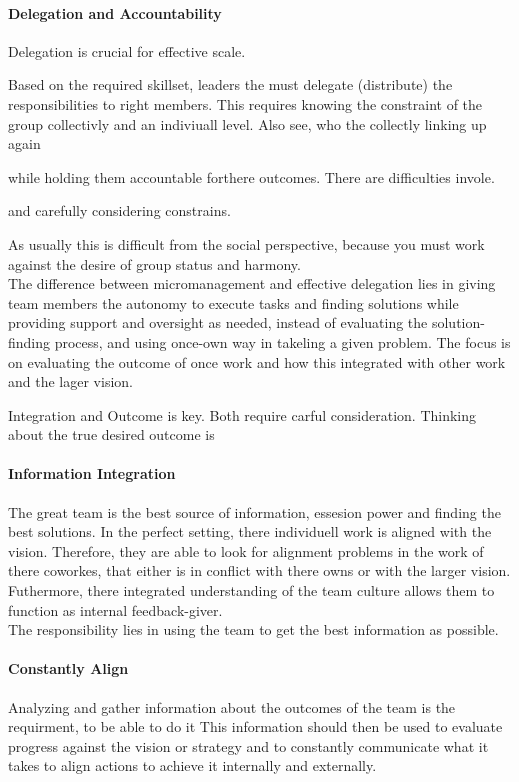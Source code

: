 \paragraph{Delegation and Accountability}
Delegation is crucial for effective scale.

Based on the required skillset, leaders  the  must delegate (distribute) the responsibilities to right members. This requires knowing the constraint of the group collectivly and an indiviuall level. Also see, who the collectly linking up again

 while holding them accountable forthere outcomes. There are difficulties invole.

and carefully considering constrains. 

As usually this is difficult from the social perspective, because you must work against the desire of group status and harmony.\\

The difference between micromanagement and effective delegation lies in giving team members the autonomy to execute tasks and finding solutions while providing support and oversight as needed, instead of evaluating the solution-finding process, and using once-own way in takeling a given problem. The focus is on evaluating the outcome of once work and how this integrated with other work and the lager vision. 


Integration and Outcome is key. Both require carful consideration. Thinking about the true desired outcome is

\paragraph{Information Integration} The great team is the best source of information, essesion power and finding the best solutions. In the perfect setting, there individuell work is aligned with the vision. Therefore, they are able to look for alignment problems in the work of there coworkes, that either is in conflict with there owns or with the larger vision. Futhermore, there integrated understanding of the team culture allows them to function as internal feedback-giver.\\

The responsibility lies in using the team to get the best information as possible.

\paragraph{Constantly Align}
Analyzing and gather information about the outcomes of the team is the requirment, to be able to do it
This information should then be used to evaluate progress against the vision or strategy and to constantly communicate what it takes to align actions to achieve it internally and externally. 


